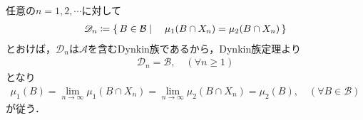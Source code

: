 		\begin{prf}
			任意の$n = 1,2,\cdots$に対して
			\begin{align}
				\mathscr{D}_n \coloneqq \left\{\, B \in \mathcal{B} \mid \quad \mu_1(B \cap X_n) = \mu_2(B \cap X_n)\, \right\}
			\end{align}
			とおけば，$\mathscr{D}_n$は$\mathcal{A}$を含むDynkin族であるから，Dynkin族定理より
			\begin{align}
				\mathscr{D}_n = \mathcal{B},\quad (\forall n \geq 1)
			\end{align}
			となり
			\begin{align}
				\mu_1(B) = \lim_{n \to \infty} \mu_1(B \cap X_n)
				= \lim_{n \to \infty} \mu_2(B \cap X_n) = \mu_2(B),
				\quad (\forall B \in \mathcal{B})
			\end{align}
			が従う．
			\QED
		\end{prf}
		
